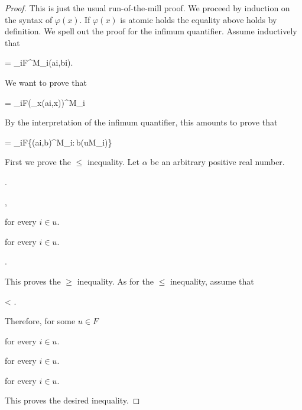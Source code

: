 \documentclass[12pt,letterpaper,oneside,reqno]{amsart}
\theoremstyle{plain}
\theoremstyle{remark}
\begin{document}
\begin{proof}
This is just the usual run-of-the-mill proof.
We proceed by induction on the syntax of $\varphi(x)$.
If $\varphi(x)$ is atomic holds the equality above holds by definition.
We spell out the proof for the infimum quantifier.
Assume inductively that

{=}
{\lim_{i\uparrow F}\varphi^{M_i}\big(\hat ai,\hat bi\big).}

We want to prove that 

{=}
{\lim_{i\uparrow F}\Big(\bigwedge_x\varphi\big(\hat ai,x\big)\Big)^{M_i}}

By the interpretation of the infimum quantifier, this amounts to prove that

{=}
{\lim_{i\uparrow F}\inf\big\{\varphi\big(\hat ai,b\big)^{M_i}:\,b\in(uM_i)\big\}}

First we prove the $\le$ inequality.
Let $\alpha$ be an arbitrary positive real number.

.

,

\quad for every $i\in u$.

\quad for every $i\in u$.

.

\smallskip
This proves the $\ge$ inequality.
As for the $\le$ inequality, assume that
\smallskip

{<}
{\alpha.}

Therefore, for some $u\in F$

\quad for every $i\in u$.

\quad for every $i\in u$.

\quad for every $i\in u$.



This proves the desired inequality.
\end{proof}
\end{document}
